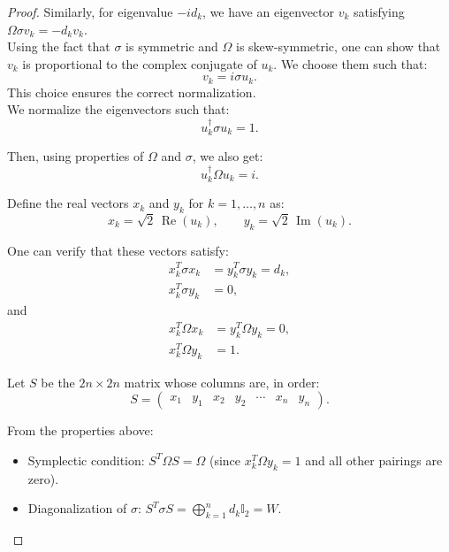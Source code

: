 \begin{proof}
Similarly, for eigenvalue $-i d_k$, we have an eigenvector $v_k$ satisfying $\Omega \sigma v_k = -d_k v_k$.\\

Using the fact that $\sigma$ is symmetric and $\Omega$ is skew-symmetric, one can show that $v_k$ is proportional to the complex conjugate of $u_k$. We choose them such that:
\begin{equation}
    v_k = i \sigma u_k.
\end{equation}
This choice ensures the correct normalization.\\

We normalize the eigenvectors such that:
\begin{equation}
    u_k^\dagger \sigma u_k = 1.
\end{equation}

Then, using properties of $\Omega$ and $\sigma$, we also get:
\begin{equation}
    u_k^\dagger \Omega u_k = i.
\end{equation}

Define the real vectors $x_k$ and $y_k$ for $k = 1, \ldots, n$ as:
\begin{equation}
    x_k = \sqrt{2} \, \operatorname{Re}(u_k), \qquad y_k = \sqrt{2} \, \operatorname{Im}(u_k).
\end{equation}

One can verify that these vectors satisfy:
\begin{align}
    x_k^T \sigma x_k &= y_k^T \sigma y_k = d_k, \\
    x_k^T \sigma y_k &= 0,
\end{align}
and
\begin{align}
    x_k^T \Omega x_k &= y_k^T \Omega y_k = 0, \\
    x_k^T \Omega y_k &= 1.
\end{align}

Let $S$ be the $2n \times 2n$ matrix whose columns are, in order:
\begin{equation}
    S = \begin{pmatrix} x_1 & y_1 & x_2 & y_2 & \cdots & x_n & y_n \end{pmatrix}.
\end{equation}

From the properties above:
\begin{itemize}
    \item Symplectic condition: $S^T \Omega S = \Omega$ (since $x_k^T \Omega y_k = 1$ and all other pairings are zero).
    \item Diagonalization of $\sigma$: $S^T \sigma S = \bigoplus_{k=1}^n d_k \mathbb{I}_2 = W$.
\end{itemize}


\end{proof}
